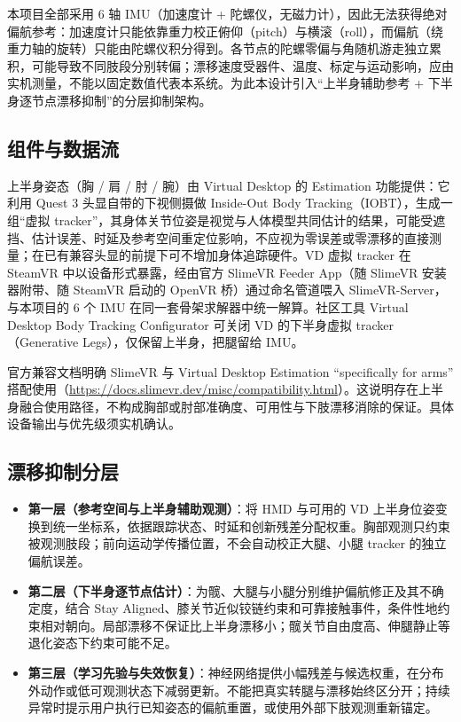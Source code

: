 \documentclass[scheme=plain,UTF8,11pt,a4paper]{ctexart}
\begin{document}
本项目全部采用 6 轴 IMU（加速度计 + 陀螺仪，无磁力计），因此无法获得绝对偏航参考：加速度计只能依靠重力校正俯仰（pitch）与横滚（roll），而偏航（绕重力轴的旋转）只能由陀螺仪积分得到。各节点的陀螺零偏与角随机游走独立累积，可能导致不同肢段分别转偏；漂移速度受器件、温度、标定与运动影响，应由实机测量，不能以固定数值代表本系统。为此本设计引入“上半身辅助参考 + 下半身逐节点漂移抑制”的分层抑制架构。

\subsection{组件与数据流}

上半身姿态（胸 / 肩 / 肘 / 腕）由 Virtual Desktop 的 Estimation 功能提供：它利用 Quest 3 头显自带的下视侧摄做 Inside-Out Body Tracking（IOBT），生成一组“虚拟 tracker”，其身体关节位姿是视觉与人体模型共同估计的结果，可能受遮挡、估计误差、时延及参考空间重定位影响，不应视为零误差或零漂移的直接测量；在已有兼容头显的前提下可不增加身体追踪硬件。VD 虚拟 tracker 在 SteamVR 中以设备形式暴露，经由官方 SlimeVR Feeder App（随 SlimeVR 安装器附带、随 SteamVR 启动的 OpenVR 桥）通过命名管道喂入 SlimeVR-Server，与本项目的 6 个 IMU 在同一套骨架求解器中统一解算。社区工具 Virtual Desktop Body Tracking Configurator 可关闭 VD 的下半身虚拟 tracker（Generative Legs），仅保留上半身，把腿留给 IMU。

官方兼容文档明确 SlimeVR 与 Virtual Desktop Estimation “specifically for arms” 搭配使用（\url{https://docs.slimevr.dev/misc/compatibility.html}）。这说明存在上半身融合使用路径，不构成胸部或肘部准确度、可用性与下肢漂移消除的保证。具体设备输出与优先级须实机确认。

\subsection{漂移抑制分层}

\begin{itemize}
    \item \textbf{第一层（参考空间与上半身辅助观测）}：将 HMD 与可用的 VD 上半身位姿变换到统一坐标系，依据跟踪状态、时延和创新残差分配权重。胸部观测只约束被观测肢段；前向运动学传播位置，不会自动校正大腿、小腿 tracker 的独立偏航误差。
    \item \textbf{第二层（下半身逐节点估计）}：为髋、大腿与小腿分别维护偏航修正及其不确定度，结合 Stay Aligned、膝关节近似铰链约束和可靠接触事件，条件性地约束相对朝向。局部漂移不保证比上半身漂移小；髋关节自由度高、伸腿静止等退化姿态下约束可能不足。
    \item \textbf{第三层（学习先验与失效恢复）}：神经网络提供小幅残差与候选权重，在分布外动作或低可观测状态下减弱更新。不能把真实转腿与漂移始终区分开；持续异常时提示用户执行已知姿态的偏航重置，或使用外部下肢观测重新锚定。
\end{itemize}
\end{document}
